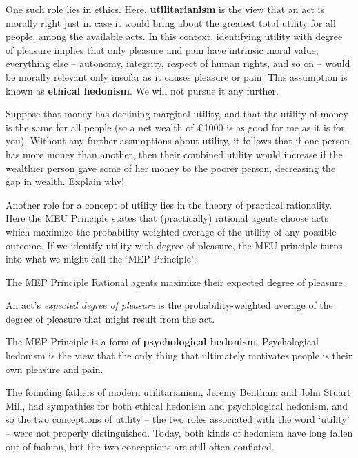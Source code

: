 One such role lies in ethics. Here, \textbf{utilitarianism} is the view that an
act is morally right just in case it would bring about the greatest total
utility for all people, among the available acts. In this context, identifying
utility with degree of pleasure implies that only pleasure and pain have
intrinsic moral value; everything else -- autonomy, integrity, respect of human
rights, and so on -- would be morally relevant only insofar as it causes
pleasure or pain. This assumption is known as \textbf{ethical hedonism}. We will
not pursue it any further.

\begin{exercise}{1}
  Suppose that money has declining marginal utility, and that the
  utility of money is the same for all people (so a net wealth of
  £1000 is as good for me as it is for you). Without any further
  assumptions about utility, it follows that if one person has more
  money than another, then their combined utility would increase if
  the wealthier person gave some of her money to the poorer person,
  decreasing the gap in wealth. Explain why!
\end{exercise}

Another role for a concept of utility lies in the theory of practical
rationality. Here the MEU Principle states that (practically) rational agents
choose acts which maximize the probability-weighted average of the utility of
any possible outcome. If we identify utility with degree of pleasure, the MEU
principle turns into what we might call the `MEP Principle':
%
\begin{genericthm}{The MEP Principle}
  Rational agents maximize their expected degree of pleasure. 
\end{genericthm}
%
An act's \emph{expected degree of pleasure} is the
probability-weighted average of the degree of pleasure that might
result from the act. 

The MEP Principle is a form of \textbf{psychological
  hedonism}. Psychological hedonism is the view that the only thing
that ultimately motivates people is their own pleasure and pain.

The founding fathers of modern utilitarianism, Jeremy Bentham and John
Stuart Mill, had sympathies for both ethical hedonism and
psychological hedonism, and so the two conceptions of utility -- the
two roles associated with the word `utility' -- were not properly
distinguished. Today, both kinds of hedonism have long fallen out of
fashion, but the two conceptions are still often conflated.

